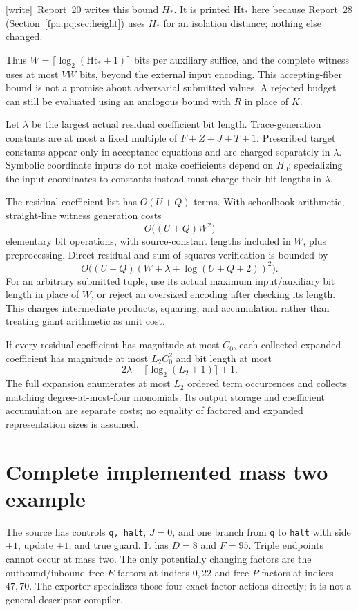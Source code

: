 \documentclass[11pt,a4paper]{article}
\numberwithin{equation}{section}
\newcommand{\wtag}{\textup{[write]}}
\begin{document}
\wtag\ Report~20 writes this bound $H_*$. It is printed $\mathrm{Ht}_*$ here because Report~28 (Section~\ref{fpa:pq:sec:height}) uses $H_*$ for an isolation distance; nothing else changed.

Thus $W=\lceil\log_2(\mathrm{Ht}_*+1)\rceil$ bits per auxiliary suffice, and the complete witness uses at most $VW$ bits, beyond the external input encoding. This accepting-fiber bound is not a promise about adversarial submitted values. A rejected budget can still be evaluated using an analogous bound with $R$ in place of $K$.

Let $\lambda$ be the largest actual residual coefficient bit length. Trace-generation constants are at most a fixed multiple of $F+Z+J+T+1$. Prescribed target constants appear only in acceptance equations and are charged separately in $\lambda$. Symbolic coordinate inputs do not make coefficients depend on $H_0$; specializing the input coordinates to constants instead must charge their bit lengths in $\lambda$.

The residual coefficient list has $O(U+Q)$ terms. With schoolbook arithmetic, straight-line witness generation costs
\[
O\bigl((U+Q)W^2\bigr)
\]
elementary bit operations, with source-constant lengths included in $W$, plus preprocessing. Direct residual and sum-of-squares verification is bounded by
\[
O\bigl((U+Q)(W+\lambda+\log(U+Q+2))^2\bigr).
\]
For an arbitrary submitted tuple, use its actual maximum input/auxiliary bit length in place of $W$, or reject an oversized encoding after checking its length. This charges intermediate products, squaring, and accumulation rather than treating giant arithmetic as unit cost.

If every residual coefficient has magnitude at most $C_0$, each collected expanded coefficient has magnitude at most $L_2C_0^2$ and bit length at most
\[
2\lambda+\lceil\log_2(L_2+1)\rceil+1.
\]
The full expansion enumerates at most $L_2$ ordered term occurrences and collects matching degree-at-most-four monomials. Its output storage and coefficient accumulation are separate costs; no equality of factored and expanded representation sizes is assumed.

\section{Complete implemented mass two example}\label{fpa:eb:sec:example}
The source has controls \texttt{q, halt}, $J=0$, and one branch from \texttt{q} to \texttt{halt} with side $+1$, update $+1$, and true guard. It has $D=8$ and $F=95$. Triple endpoints cannot occur at mass two. The only potentially changing factors are the outbound/inbound free $E$ factors at indices $0,22$ and free $P$ factors at indices $47,70$. The exporter specializes those four exact factor actions directly; it is not a general descriptor compiler.
\end{document}
